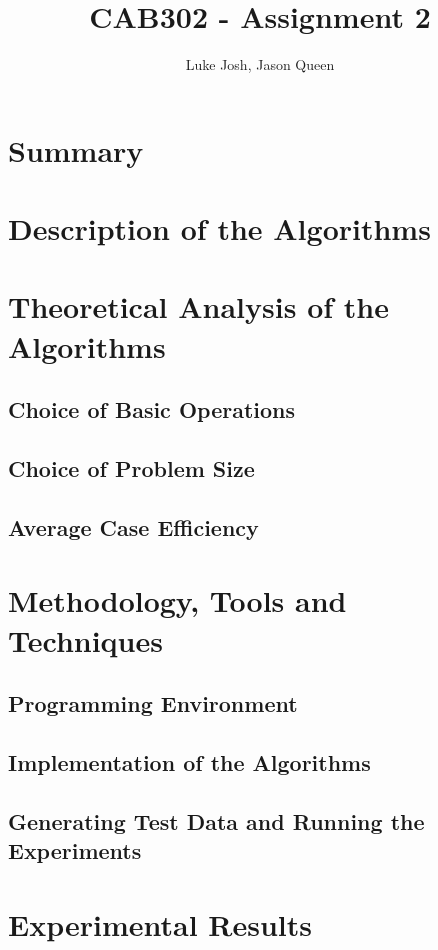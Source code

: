 \documentclass{article}
\title{CAB302 - Assignment 2}
\author{Luke Josh, Jason Queen}
\begin{document}

\maketitle
\tableofcontents

\section{Summary}

\section{Description of the Algorithms}

\section{Theoretical Analysis of the Algorithms}
    \subsection{Choice of Basic Operations}
    \subsection{Choice of Problem Size}
    \subsection{Average Case Efficiency}

\section{Methodology, Tools and Techniques}
    \subsection{Programming Environment}
    \subsection{Implementation of the Algorithms}
    \subsection{Generating Test Data and Running the Experiments}

\section{Experimental Results}
\end{document}

